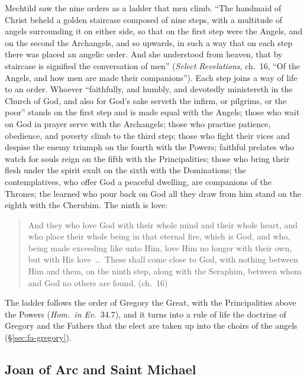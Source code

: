 Mechtild saw the nine orders as a ladder that men climb. ``The handmaid of
Christ beheld a golden staircase composed of nine steps, with a multitude of
angels surrounding it on either side, so that on the first step were the
Angels, and on the second the Archangels, and so upwards, in such a way that
on each step there was placed an angelic order. And she understood from
heaven, that by staircase is signified the conversation of men'' (\emph{Select
Revelations}, ch.~16, ``Of the Angels, and how men are made their
companions''). Each step joins a way of life to an order. Whoever
``faithfully, and humbly, and devotedly ministereth in the Church of God, and
also for God's sake serveth the infirm, or pilgrims, or the poor'' stands on
the first step and is made equal with the Angels; those who wait on God in
prayer serve with the Archangels; those who practise patience, obedience,
and poverty climb to the third step; those who fight their vices and despise
the enemy triumph on the fourth with the Powers; faithful prelates who watch
for souls reign on the fifth with the Principalities; those who bring their
flesh under the spirit exult on the sixth with the Dominations; the
contemplatives, who offer God a peaceful dwelling, are companions of the
Thrones; the learned who pour back on God all they draw from him stand on
the eighth with the Cherubim. The ninth is love:
\begin{quote}
And they who love God with their whole mind and their whole heart, and who
place their whole being in that eternal fire, which is God, and who, being
made exceeding like unto Him, love Him no longer with their own, but with
His love~\dots\ These shall come close to God, with nothing between Him and
them, on the ninth step, along with the Seraphim, between whom and God no
others are found. (ch.~16)
\end{quote}
The ladder follows the order of Gregory the Great, with the Principalities
above the Powers (\emph{Hom.\ in Ev.}\ 34.7), and it turns into a rule
of life the doctrine of Gregory and the Fathers that the elect are taken up
into the choirs of the angels (\S\ref{sec:fa-gregory}).

\sectionguard\subsection{Joan of Arc and Saint Michael}\label{sec:sa-joan}

